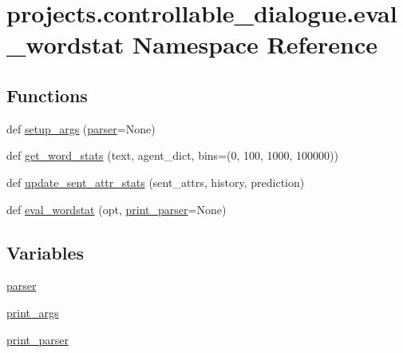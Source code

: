 \hypertarget{namespaceprojects_1_1controllable__dialogue_1_1eval__wordstat}{}\section{projects.\+controllable\+\_\+dialogue.\+eval\+\_\+wordstat Namespace Reference}
\label{namespaceprojects_1_1controllable__dialogue_1_1eval__wordstat}
\subsection*{Functions}
\begin{DoxyCompactItemize}
\item 
def \hyperlink{namespaceprojects_1_1controllable__dialogue_1_1eval__wordstat_aa40ff30af74bd5824589612828146ec8}{setup\+\_\+args} (\hyperlink{namespaceprojects_1_1controllable__dialogue_1_1eval__wordstat_a9599ab33fd286db6a73c246ab80de27f}{parser}=None)
\item 
def \hyperlink{namespaceprojects_1_1controllable__dialogue_1_1eval__wordstat_af8f7aeddab4a5c7f0a5597bdb09f40ae}{get\+\_\+word\+\_\+stats} (text, agent\+\_\+dict, bins=(0, 100, 1000, 100000))
\item 
def \hyperlink{namespaceprojects_1_1controllable__dialogue_1_1eval__wordstat_a1bc3cda7d486add0d740338df4688622}{update\+\_\+sent\+\_\+attr\+\_\+stats} (sent\+\_\+attrs, history, prediction)
\item 
def \hyperlink{namespaceprojects_1_1controllable__dialogue_1_1eval__wordstat_aa89fea1e83d255fa77e81e73a7d81161}{eval\+\_\+wordstat} (opt, \hyperlink{namespaceprojects_1_1controllable__dialogue_1_1eval__wordstat_ada9cf33816fefa715c6df2aee0b8125d}{print\+\_\+parser}=None)
\end{DoxyCompactItemize}
\subsection*{Variables}
\begin{DoxyCompactItemize}
\item 
\hyperlink{namespaceprojects_1_1controllable__dialogue_1_1eval__wordstat_a9599ab33fd286db6a73c246ab80de27f}{parser}
\item 
\hyperlink{namespaceprojects_1_1controllable__dialogue_1_1eval__wordstat_ada1c5b8154efb70c2be3cad4e8ad71e1}{print\+\_\+args}
\item 
\hyperlink{namespaceprojects_1_1controllable__dialogue_1_1eval__wordstat_ada9cf33816fefa715c6df2aee0b8125d}{print\+\_\+parser}
\end{DoxyCompactItemize}


